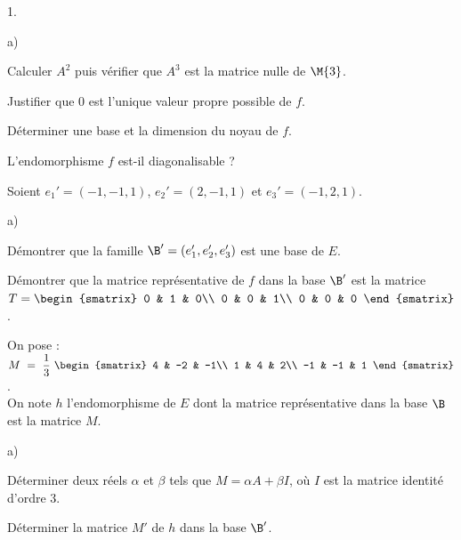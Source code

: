 \documentclass[11pt]{article}%
\begin{document}
\begin{noliste}{1.}
  \setlength{\itemsep}{4mm}
\item  
  \begin{noliste}{a)}
    \setlength{\itemsep}{2mm}
  \item Calculer $A^2$ puis vérifier que $A^3$ est la matrice nulle de 
    $\M{3}$.
    
  \item Justifier que $0$ est l'unique valeur propre possible de $f$.
    
  \item Déterminer une base et la dimension du noyau de $f$. 
    
  \item L'endomorphisme $f$ est-il diagonalisable ?
  \end{noliste}
  
\item Soient $e_1'=(-1,-1,1)$, $e_2'=(2,-1,1)$ et $e_3'=(-1,2,1)$.
  \begin{noliste}{a)}
    \setlength{\itemsep}{2mm}
  \item Démontrer que la famille $\B'=(e_1',e_2',e_3')$ est une base
    de $E$.
    
  \item Démontrer que la matrice représentative de $f$ dans la base
    $\B'$ est la matrice $T =
    \begin{smatrix}
      0 & 1 & 0\\
      0 & 0 & 1\\
      0 & 0 & 0
    \end{smatrix}$.
  \end{noliste}
  
\item On pose : $M \ = \ \dfrac{1}{3} \ 
  \begin{smatrix}
    4 & -2 & -1\\
    1 & 4 & 2\\
    -1 & -1 & 1
  \end{smatrix}$.\\[.1cm]
  On note $h$ l'endomorphisme de $E$ dont la matrice représentative dans la 
  base $\B$ est la matrice $M$. 
  \begin{noliste}{a)}
    \setlength{\itemsep}{2mm}
  \item Déterminer deux réels $\alpha$ et $\beta$ tels que $M=\alpha A
    + \beta I$, où $I$ est la matrice identité d'ordre $3$.
    
  \item Déterminer la matrice $M'$ de $h$ dans la base $\B'$.
    

\end{noliste}
\end{noliste}
\end{document}
